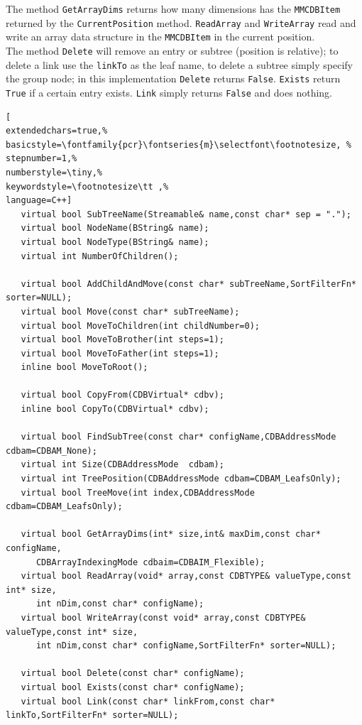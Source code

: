 The method \texttt{GetArrayDims} returns how many dimensions has the \texttt{MMCDBItem} returned by the \texttt{CurrentPosition} method. \texttt{ReadArray} and \texttt{WriteArray} read and write an array data structure in the \texttt{MMCDBItem} in the current position. \\


The method \texttt{Delete} will remove an entry or subtree (position is relative); to delete a link use the \texttt{linkTo} as the leaf name, to delete a subtree simply specify the group node; in this implementation \texttt{Delete} returns \texttt{False}. \texttt{Exists} return \texttt{True} if a certain entry exists. \texttt{Link} simply returns \texttt{False} and does nothing.

\begin{lstlisting}[
extendedchars=true,%
basicstyle=\fontfamily{pcr}\fontseries{m}\selectfont\footnotesize, %
stepnumber=1,%
numberstyle=\tiny,%
keywordstyle=\footnotesize\tt ,%
language=C++]
   virtual bool SubTreeName(Streamable& name,const char* sep = ".");
   virtual bool NodeName(BString& name);
   virtual bool NodeType(BString& name);
   virtual int NumberOfChildren();

   virtual bool AddChildAndMove(const char* subTreeName,SortFilterFn* sorter=NULL);
   virtual bool Move(const char* subTreeName);
   virtual bool MoveToChildren(int childNumber=0);
   virtual bool MoveToBrother(int steps=1);
   virtual bool MoveToFather(int steps=1);
   inline bool MoveToRoot();

   virtual bool CopyFrom(CDBVirtual* cdbv);
   inline bool CopyTo(CDBVirtual* cdbv);

   virtual bool FindSubTree(const char* configName,CDBAddressMode cdbam=CDBAM_None);
   virtual int Size(CDBAddressMode  cdbam);
   virtual int TreePosition(CDBAddressMode cdbam=CDBAM_LeafsOnly);
   virtual bool TreeMove(int index,CDBAddressMode cdbam=CDBAM_LeafsOnly);

   virtual bool GetArrayDims(int* size,int& maxDim,const char* configName,
      CDBArrayIndexingMode cdbaim=CDBAIM_Flexible);
   virtual bool ReadArray(void* array,const CDBTYPE& valueType,const int* size,
      int nDim,const char* configName);
   virtual bool WriteArray(const void* array,const CDBTYPE& valueType,const int* size,
      int nDim,const char* configName,SortFilterFn* sorter=NULL);

   virtual bool Delete(const char* configName);
   virtual bool Exists(const char* configName);
   virtual bool Link(const char* linkFrom,const char* linkTo,SortFilterFn* sorter=NULL);
\end{lstlisting}


